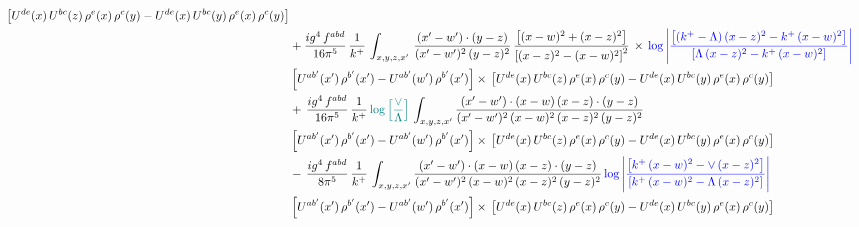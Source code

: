 \documentclass[9pt]{article}
\numberwithin{equation}{section}
\begin{document}
\begin{align}
\left[U^{de}(x)\,U^{bc}(z)\, \rho^{e}(x)\,\rho^{c}(y)-U^{de}(x)\,U^{bc}(y)\,\rho^{e}(x)\,\rho^{c}(y)\right]\notag \\ & +\frac{ig^{4}\,f^{abd}}{16\pi^{5}}\, \frac{1}{k^{+}}\,\int_{x,y,z,x'}\, \frac{(x'-w')\cdot (y-z)}{(x'-w')^{2}\,(y-z)^{2}}\, \frac{\left[(x-w)^{2}+(x-z)^{2}\right]}{\left[(x-z)^{2}-(x-w)^{2}\right]^{2}}\, \times\, {\color{blue}\log{\left|\frac{\left[(k^{+}-\Lambda)\, (x-z)^{2} - k^{+}\, (x-w)^{2}\right]}{\left[\Lambda\, (x-z)^{2} - k^{+}\, (x-w)^{2}\right]}\right|}}\notag \\ & \left[U^{ab'}(x')\,\rho^{b'}(x')-U^{ab'}(w')\, \rho^{b'}(x')\right]\times\, \left[U^{de}(x)\,U^{bc}(z)\, \rho^{e}(x)\,\rho^{c}(y)-U^{de}(x)\,U^{bc}(y)\,\rho^{e}(x)\,\rho^{c}(y)\right]\notag \\ & +\, \frac{ig^{4}\,f^{abd}}{16\pi^{5}}\,\frac{1}{k^{+}}\,{\color{teal}\log{\left[\frac{\vee}{\Lambda}\right]}}\,\int_{x,y,z,x'} \frac{(x'-w')\cdot (x-w)\, (x-z)\cdot (y-z)}{(x'-w')^{2}\, (x-w)^{2}\, (x-z)^{2}\, (y-z)^{2}}\, \notag \\ & \left[U^{ab'}(x')\,\rho^{b'}(x')-U^{ab'}(w')\, \rho^{b'}(x')\right]\times\, \left[U^{de}(x)\,U^{bc}(z)\, \rho^{e}(x)\,\rho^{c}(y)-U^{de}(x)\,U^{bc}(y)\,\rho^{e}(x)\,\rho^{c}(y)\right]\notag \\ &-\, \frac{ig^{4}\,f^{abd}}{8\pi^{5}}\,\frac{1}{k^{+}}\,\int_{x,y,z,x'}\frac{(x'-w')\cdot (x-w)\, (x-z)\cdot (y-z)}{(x'-w')^{2}\, (x-w)^{2}\, (x-z)^{2}\, (y-z)^{2}}\,{\color{blue}\log{\left|\frac{\left[k^{+}\,(x-w)^{2}-\vee\, (x-z)^{2}\right]}{\left[k^{+}\,(x-w)^{2}-\Lambda\, (x-z)^{2}\right]}\right|}} \notag \\ & \left[U^{ab'}(x')\,\rho^{b'}(x')-U^{ab'}(w')\, \rho^{b'}(x')\right]\times\, \left[U^{de}(x)\,U^{bc}(z)\, \rho^{e}(x)\,\rho^{c}(y)-U^{de}(x)\,U^{bc}(y)\,\rho^{e}(x)\,\rho^{c}(y)\right]
\end{align}
\end{document}
